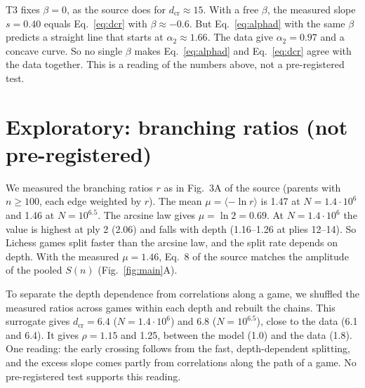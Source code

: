 \documentclass[11pt]{article}
\begin{document}
T3 fixes $\beta=0$, as the source does for $d_{\mathrm{cr}}\approx15$. With a free $\beta$, the measured slope $s=0.40$ equals Eq.~\eqref{eq:dcr} with $\beta\approx-0.6$. But Eq.~\eqref{eq:alphad} with the same $\beta$ predicts a straight line that starts at $\alpha_2\approx1.66$. The data give $\alpha_2=0.97$ and a concave curve. So no single $\beta$ makes Eq.~\eqref{eq:alphad} and Eq.~\eqref{eq:dcr} agree with the data together. This is a reading of the numbers above, not a pre-registered test.

\section{Exploratory: branching ratios (not pre-registered)}\label{sec:explore}
We measured the branching ratios $r$ as in Fig.~3A of the source (parents with $n\ge100$, each edge weighted by $r$). The mean $\mu=\langle-\ln r\rangle$ is 1.47 at $N=1.4\cdot10^6$ and 1.46 at $N=10^{6.5}$. The arcsine law gives $\mu=\ln2=0.69$. At $N=1.4\cdot10^6$ the value is highest at ply 2 (2.06) and falls with depth (1.16--1.26 at plies 12--14). So Lichess games split faster than the arcsine law, and the split rate depends on depth. With the measured $\mu=1.46$, Eq.~8 of the source matches the amplitude of the pooled $S(n)$ (Fig.~\ref{fig:main}A).

To separate the depth dependence from correlations along a game, we shuffled the measured ratios across games within each depth and rebuilt the chains. This surrogate gives $d_{\mathrm{cr}}=6.4$ ($N=1.4\cdot10^6$) and 6.8 ($N=10^{6.5}$), close to the data (6.1 and 6.4). It gives $\rho=1.15$ and 1.25, between the model (1.0) and the data (1.8). One reading: the early crossing follows from the fast, depth-dependent splitting, and the excess slope comes partly from correlations along the path of a game. No pre-registered test supports this reading.
\end{document}
